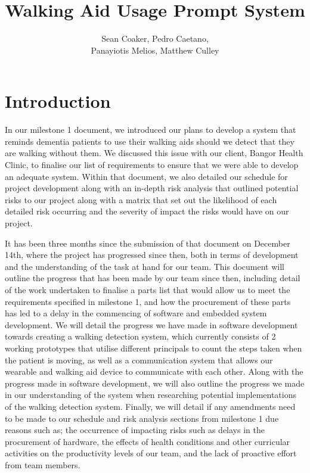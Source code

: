 \documentclass[12pt, a4paper]{report}
\title{Walking Aid Usage Prompt System}
\author{Sean Coaker, Pedro Caetano, \\Panayiotis Melios, Matthew Culley}
\begin{document}
\maketitle
\makeabstract
\maketableofcontents


\chapter{Introduction} 

In our milestone 1 document, we introduced our plans to develop a system that reminds dementia patients to use their walking aids should we detect that they are walking without them. We discussed this issue with our client, Bangor Health Clinic, to finalise our list of requirements to ensure that we were able to develop an adequate system. Within that document, we also detailed our schedule for project development along with an in-depth risk analysis that outlined potential risks to our project along with a matrix that set out the likelihood of each detailed risk occurring and the severity of impact the risks would have on our project.

It has been three months since the submission of that document on December 14th, where the project has progressed since then, both in terms of development and the understanding of the task at hand for our team. This document will outline the progress that has been made by our team since then, including detail of the work undertaken to finalise a parts list that would allow us to meet the requirements specified in milestone 1, and how the procurement of these parts has led to a delay in the commencing of software and embedded system development. We will detail the progress we have made in software development towards creating a walking detection system, which currently consists of 2 working prototypes that utilise different principals to count the steps taken when the patient is moving, as well as a communication system that allows our wearable and walking aid device to communicate with each other. Along with the progress made in software development, we will also outline the progress we  made in our understanding of the system when researching potential implementations of the walking detection system. Finally, we will detail if any amendments need to be made to our schedule and risk analysis sections from milestone 1 due reasons such as; the occurrence of impacting risks such as delays in the procurement of hardware, the effects of health conditions and other curricular activities on the productivity levels of our team, and the lack of proactive effort from team members.
\end{document}
